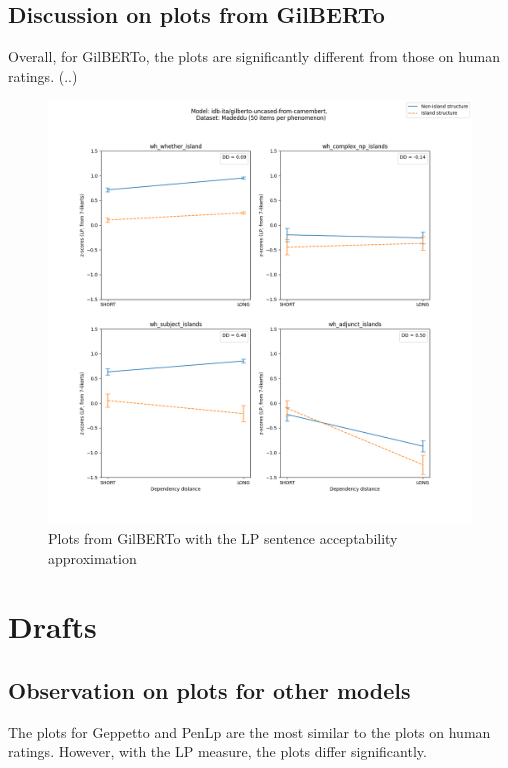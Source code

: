 \subsection{Discussion on plots from GilBERTo}

Overall, for GilBERTo, the plots are significantly different from those on human ratings. (..)

\begin{figure}[H]
	\centering
	\includegraphics[width=1\textwidth]{images/AppendixA/Madeddu_wh_idb-ita_gilberto-uncased-from-camembert_LP-zscores-likert-2022-07-11.png} 
	\caption{Plots from GilBERTo with the LP sentence acceptability approximation}
	\label{fig:gilberto_lp_madeddu}
\end{figure}


\section{Drafts}
\subsection{Observation on plots for other models}


The plots for Geppetto and PenLp are the most similar to the plots on human ratings. However, with the LP measure, the plots differ significantly.

